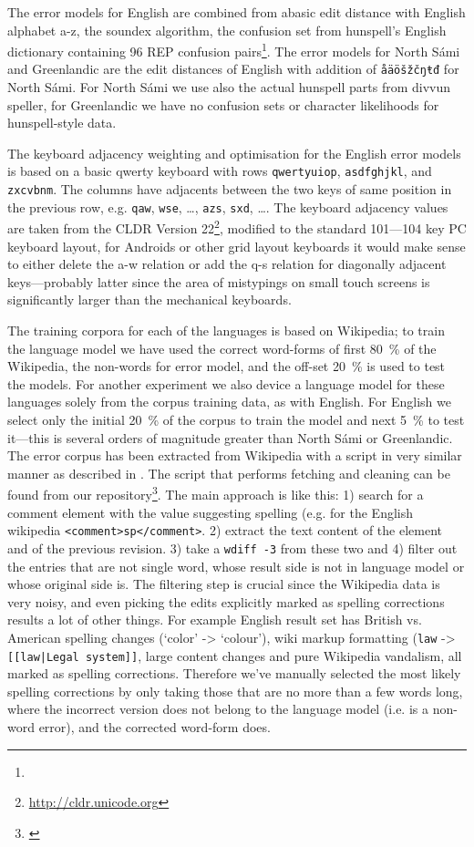 \documentclass[a4paper,12pt]{article}
\begin{document}
The error models for English are combined from abasic edit distance with
English alphabet a-z, the soundex algorithm, the confusion set from hunspell's
English dictionary containing 96 REP confusion pairs\footnote{}. The error models for North Sámi and Greenlandic are the edit
distances of English with addition of \texttt{åäöšžčŋŧđ} for North Sámi. For
North Sámi we use also the actual hunspell parts from divvun speller, for
Greenlandic we have no confusion sets or character likelihoods for
hunspell-style data.

The keyboard adjacency weighting and optimisation for the English error models
is based on a basic qwerty keyboard with rows \texttt{qwertyuiop},
\texttt{asdfghjkl}, and \texttt{zxcvbnm}. The columns have adjacents between
the two keys of same position in the previous row, e.g. \texttt{qaw},
\texttt{wse}, \ldots, \texttt{azs}, \texttt{sxd}, \ldots.  The keyboard
adjacency values are taken from the CLDR Version
22\footnote{\url{http://cldr.unicode.org}}, modified to the standard 101---104
key PC keyboard layout, for Androids or other grid layout keyboards it would
make sense to either delete the a-w relation or add the q-s relation for
diagonally adjacent keys---probably latter since the area of mistypings on
small touch screens is significantly larger than the mechanical keyboards.

The training corpora for each of the languages is based on Wikipedia; to train
the language model we have used the correct word-forms of first 80~\% of the
Wikipedia, the non-words for error model, and the off-set 20~\% is used to test
the models. For another experiment we also device a language model for these
languages solely from the corpus training data, as with English.  For English
we select only the initial 20~\% of the corpus to train the model and next 5~\%
to test  it---this
is several orders of magnitude greater than
North Sámi or Greenlandic. The error corpus has been extracted from Wikipedia
with a script in very similar manner as described in \cite{max2010mining}. The
script that performs fetching and cleaning can be found from our
repository\footnote{\url{}}. The main approach is like this: 1) search for a
comment element with the value suggesting spelling (e.g. for the English
wikipedia \texttt{<comment>sp</comment>}. 2) extract the text content of the
element and of the previous revision. 3) take a \texttt{wdiff -3} from these
two and 4) filter out the entries that are not single word, whose result side
is not in language model or whose original side is.  The filtering step is
crucial since the Wikipedia data is very noisy, and even picking the edits
explicitly marked as spelling corrections results a lot of other things. For
example English result set has British vs.  American spelling changes (`color'
-> `colour'), wiki markup formatting (\texttt{law} -> \texttt{[[law|Legal
system]]}, large content changes and pure Wikipedia vandalism, all marked as
spelling corrections. Therefore we've manually selected the most likely spelling
corrections by only taking those that are no more than a few words long, where
the incorrect version does not belong to the language model (i.e. is a non-word
error), and the corrected word-form does.
\end{document}

